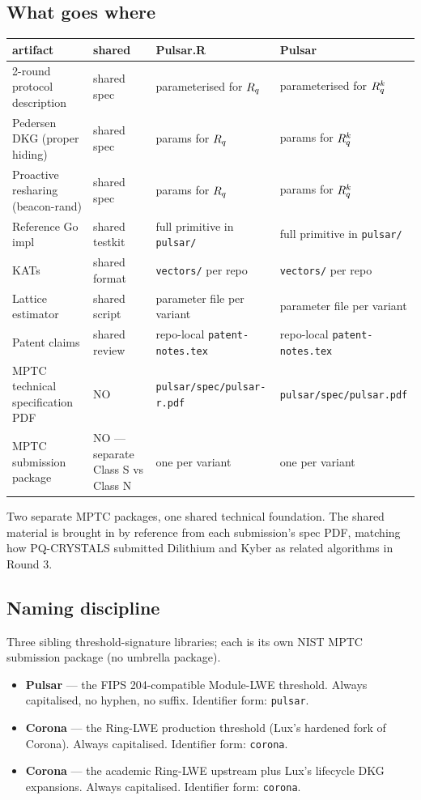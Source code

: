 \subsection{What goes where}

\begin{center}
\small
\begin{tabular}{p{4.0cm}p{2.5cm}p{3.5cm}p{3.5cm}}
\toprule
artifact & shared & Pulsar.R & Pulsar \\
\midrule
2-round protocol description & shared spec &
  parameterised for $R_q$ & parameterised for $R_q^k$ \\
Pedersen DKG (proper hiding) & shared spec &
  params for $R_q$ & params for $R_q^k$ \\
Proactive resharing (beacon-rand) & shared spec &
  params for $R_q$ & params for $R_q^k$ \\
Reference Go impl & shared testkit &
  full primitive in \texttt{pulsar/} &
  full primitive in \texttt{pulsar/} \\
KATs & shared format &
  \texttt{vectors/} per repo &
  \texttt{vectors/} per repo \\
Lattice estimator & shared script &
  parameter file per variant &
  parameter file per variant \\
Patent claims & shared review &
  repo-local \texttt{patent-notes.tex} &
  repo-local \texttt{patent-notes.tex} \\
MPTC technical specification PDF & NO &
  \texttt{pulsar/spec/pulsar-r.pdf} &
  \texttt{pulsar/spec/pulsar.pdf} \\
MPTC submission package & NO --- separate Class S vs Class N &
  one per variant & one per variant \\
\bottomrule
\end{tabular}
\end{center}

Two separate MPTC packages, one shared technical foundation. The
shared material is brought in by reference from each submission's
spec PDF, matching how PQ-CRYSTALS submitted Dilithium and Kyber as
related algorithms in Round 3.

\subsection{Naming discipline}

Three sibling threshold-signature libraries; each is its own NIST
MPTC submission package (no umbrella package).

\begin{itemize}[leftmargin=*, itemsep=0pt]
\item \textbf{Pulsar} --- the FIPS 204-compatible Module-LWE
threshold. Always capitalised, no hyphen, no suffix. Identifier
form: \texttt{pulsar}.
\item \textbf{Corona} --- the Ring-LWE production threshold (Lux's
hardened fork of Corona). Always capitalised. Identifier form:
\texttt{corona}.
\item \textbf{Corona} --- the academic Ring-LWE upstream plus Lux's
lifecycle DKG expansions. Always capitalised. Identifier form:
\texttt{corona}.
\end{itemize}

